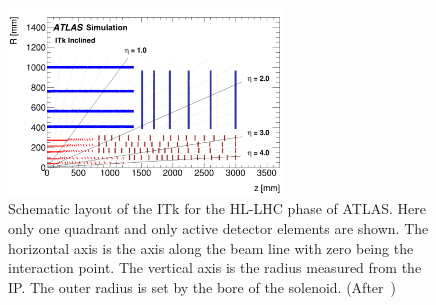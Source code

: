 \begin{figure}[!htpb]
\centering
\includegraphics[width=0.65\textwidth]{ITk_Layout.pdf}
\caption{\label{fig:ITk_Layout}Schematic layout of the ITk for the HL-LHC phase of ATLAS. Here only one quadrant and only active detector elements are shown. The horizontal axis is the axis along the beam line with zero being the interaction point. The vertical axis is the radius measured from the IP. The outer radius is set by the bore of the solenoid. (After~\cite{ITkStripsTDR})}
\end{figure}

